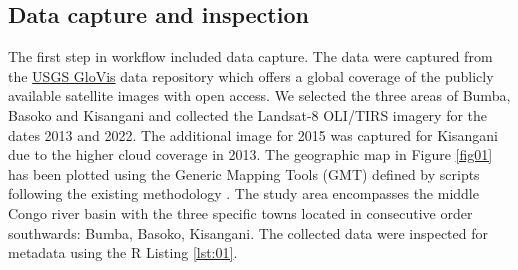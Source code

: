 \documentclass[applsci,article,submit,pdftex,moreauthors]{Definitions/mdpi}
\begin{document}
\subsection{Data capture and inspection}

The first step in workflow included data capture. The data were captured from the \href{https://glovis.usgs.gov/app}{USGS GloVis} data repository which offers a global coverage of the publicly available satellite images with open access. We selected the three areas of Bumba, Basoko and Kisangani and collected the Landsat-8 OLI/TIRS imagery for the dates 2013 and 2022. The additional image for 2015 was captured for Kisangani due to the higher cloud coverage in 2013.  The geographic map in Figure \ref{fig01} has been plotted using the Generic Mapping Tools (GMT) defined by scripts following the existing methodology \cite{Lemenkova202212,Lemenkova202217,Lemenkova2022b}. The study area encompasses the middle Congo river basin with the three specific towns located in consecutive order southwards: Bumba, Basoko, Kisangani. The collected data were inspected for metadata using the R Listing \ref{lst:01}. 
\end{document}

